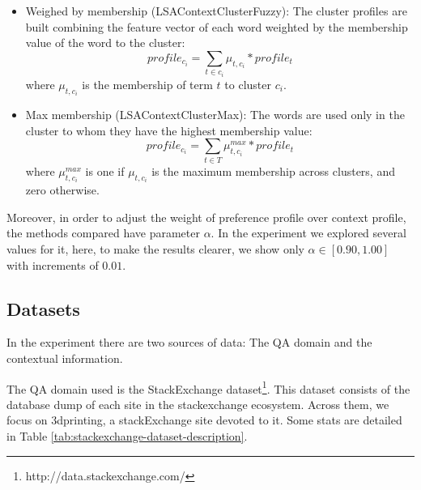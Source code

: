 \documentclass[preprint]{elsarticle}
\begin{document}
\begin{spacing}{1.5}
\begin{itemize}
	\item Weighed by membership (LSAContextClusterFuzzy): The cluster profiles are built combining the feature vector of each word weighted by the membership value of the word to the cluster:
	\begin{equation}
		profile_{c_i} = \sum_{t \in c_i} \mu_{t,c_i} * profile_t
	\end{equation}
	\noindent where $\mu_{t,c_i}$ is the membership of term $t$ to cluster $c_i$.

	\item Max membership (LSAContextClusterMax): The words are used only in the cluster to whom they have the highest membership value:
	\begin{equation}
		profile_{c_i} = \sum_{t \in T} \mu^{max}_{t,c_i} * profile_t
	\end{equation}
	\noindent where $\mu^{max}_{t,c_i}$ is one if $\mu_{t,c_i}$ is the maximum membership across clusters, and zero otherwise.

\end{itemize}

Moreover, in order to adjust the weight of preference profile over context profile, the methods compared have parameter $\alpha$. In the experiment we explored several values for it, here, to make the results clearer, we show only $\alpha \in [0.90,1.00]$ with increments of $0.01$.

\subsection{Datasets}
\label{sec:case-study-datasets}

In the experiment there are two sources of data: The QA domain and the contextual information.

The QA domain used is the StackExchange dataset\footnote{http://data.stackexchange.com/}. This dataset consists of the database dump of each site in the stackexchange ecosystem. Across them, we focus on 3dprinting, a stackExchange site devoted to it. Some stats are detailed in Table \ref{tab:stackexchange-dataset-description}.


\end{spacing}
\end{document}
